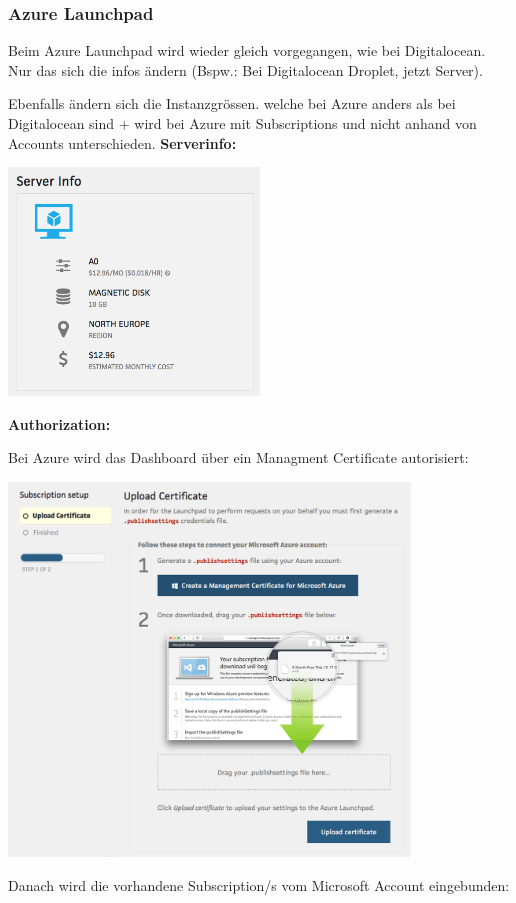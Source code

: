 \documentclass[11pt]{scrartcl}
\begin{document}
\subsubsection{Azure Launchpad}
Beim Azure Launchpad wird wieder gleich vorgegangen, wie bei Digitalocean.
Nur das sich die infos ändern (Bspw.: Bei Digitalocean Droplet, jetzt Server).

Ebenfalls ändern sich die Instanzgrössen. welche bei Azure anders als bei 
Digitalocean sind + wird bei Azure mit Subscriptions und nicht anhand von 
Accounts unterschieden.
\textbf{Serverinfo:}

\includegraphics[width=0.5\textwidth]{azure_serverinfo}

\textbf{Authorization:}

Bei Azure wird das Dashboard über ein Managment Certificate autorisiert:

\includegraphics[width=0.8\textwidth]{azure_authorize}

Danach wird die vorhandene Subscription/s vom Microsoft Account eingebunden:
\end{document}
